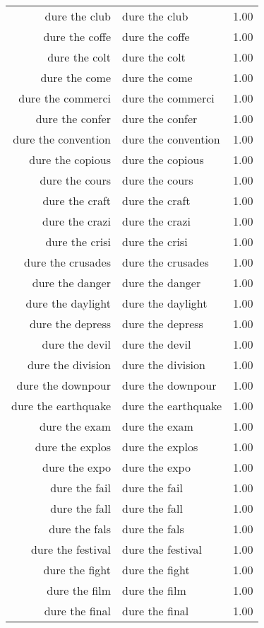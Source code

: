 \begin{table}[ht]
\begin{tabular}{rlr}
  dure the club & dure the club & 1.00 \\ 
  dure the coffe & dure the coffe & 1.00 \\ 
  dure the colt & dure the colt & 1.00 \\ 
  dure the come & dure the come & 1.00 \\ 
  dure the commerci & dure the commerci & 1.00 \\ 
  dure the confer & dure the confer & 1.00 \\ 
  dure the convention & dure the convention & 1.00 \\ 
  dure the copious & dure the copious & 1.00 \\ 
  dure the cours & dure the cours & 1.00 \\ 
  dure the craft & dure the craft & 1.00 \\ 
  dure the crazi & dure the crazi & 1.00 \\ 
  dure the crisi & dure the crisi & 1.00 \\ 
  dure the crusades & dure the crusades & 1.00 \\ 
  dure the danger & dure the danger & 1.00 \\ 
  dure the daylight & dure the daylight & 1.00 \\ 
  dure the depress & dure the depress & 1.00 \\ 
  dure the devil & dure the devil & 1.00 \\ 
  dure the division & dure the division & 1.00 \\ 
  dure the downpour & dure the downpour & 1.00 \\ 
  dure the earthquake & dure the earthquake & 1.00 \\ 
  dure the exam & dure the exam & 1.00 \\ 
  dure the explos & dure the explos & 1.00 \\ 
  dure the expo & dure the expo & 1.00 \\ 
  dure the fail & dure the fail & 1.00 \\ 
  dure the fall & dure the fall & 1.00 \\ 
  dure the fals & dure the fals & 1.00 \\ 
  dure the festival & dure the festival & 1.00 \\ 
  dure the fight & dure the fight & 1.00 \\ 
  dure the film & dure the film & 1.00 \\ 
  dure the final & dure the final & 1.00 \\ 

\end{tabular}
\end{table}
